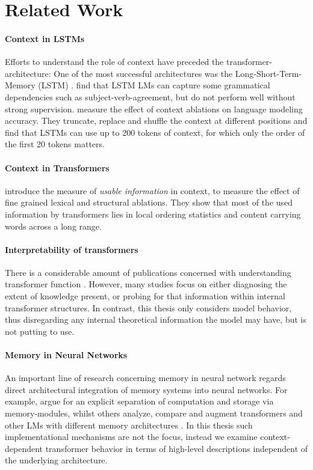 \section{Related Work}

\paragraph{Context in LSTMs} Efforts to understand the role of context have preceded the transformer-architecture: One of the most successful architectures was the Long-Short-Term-Memory (LSTM) \parencite{hochreiter_long_1997}. \textcite{linzen_assessing_2016} find that LSTM LMs can capture some grammatical dependencies such as subject-verb-agreement, but do not perform well without strong supervision. \textcite{khandelwal_sharp_2018} measure the effect of context ablations on language modeling accuracy. They truncate, replace and shuffle the context at different positions and find that LSTMs can use up to 200 tokens of context, for which only the order of the first 20 tokens matters.

\paragraph{Context in Transformers} \cite{oconnor_what_2021} introduce the measure of \textit{usable information} in context, to measure the effect of fine grained lexical and structural ablations.
They show that most of the used information by transformers lies in local ordering statistics and content carrying words across a long range.

\paragraph{Interpretability of transformers} There is a considerable amount of publications concerned with understanding transformer function \parencite{rogers_primer_2020}.
However, many studies focus on either diagnosing the extent of knowledge present, or probing for that information within internal transformer structures.
In contrast, this thesis only considers model behavior, thus disregarding any internal theoretical information the model may have, but is not putting to use.

\paragraph{Memory in Neural Networks} An important line of research concerning memory in neural network regards direct architectural integration of memory systems into neural networks.
For example, \cite{nematzadeh_memory_2020} argue for an explicit separation of computation and storage via memory-modules, whilst others analyze, compare and augment transformers and other LMs with different memory architectures  \parencite{yogatama_memory_2022,tay_efficient_2022}.
In this thesis such implementational mechanisms are not the focus, instead we examine context-dependent transformer behavior in terms of high-level descriptions independent of the underlying architecture.

